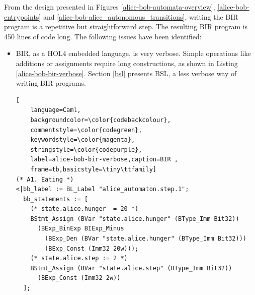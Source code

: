 \documentclass{kththesis}
\begin{document}
{From the design presented in Figures \ref{alice-bob-automata-overview}, \ref{alice-bob-entrypoints} and \ref{alice-bob-alice_autonomous_transitions}, writing the BIR program is a repetitive but straightforward step. The resulting BIR program is 450 lines of code long. The following issues have been identified:

\begin{itemize}
    \item BIR, as a HOL4 embedded language, is very verbose. Simple operations like additions or assignments require long constructions, as shown in Listing \ref{alice-bob-bir-verbose}. Section \ref{bsl} presents BSL, a less verbose way of writing BIR programs.
\begin{lstlisting}[
    language=Caml,
    backgroundcolor=\color{codebackcolour},
    commentstyle=\color{codegreen},
    keywordstyle=\color{magenta},
    stringstyle=\color{codepurple},
    label=alice-bob-bir-verbose,caption=BIR ,
    frame=tb,basicstyle=\tiny\ttfamily]
(* A1. Eating *)                                                                                                                     
<|bb_label := BL_Label "alice_automaton.step.1";                                                                                     
  bb_statements := [                                                                                                                 
    (* state.alice.hunger -= 20 *)                                                                                                   
    BStmt_Assign (BVar "state.alice.hunger" (BType_Imm Bit32))                                                                       
      (BExp_BinExp BIExp_Minus                                                                                                       
        (BExp_Den (BVar "state.alice.hunger" (BType_Imm Bit32)))                                                                   
        (BExp_Const (Imm32 20w)));                                                                                                 
    (* state.alice.step := 2 *)                                                                                                      
    BStmt_Assign (BVar "state.alice.step" (BType_Imm Bit32))                                                                         
      (BExp_Const (Imm32 2w))                                                                                                        
  ];                                                                                                                                 

\end{lstlisting}
\end{itemize}}
\end{document}

